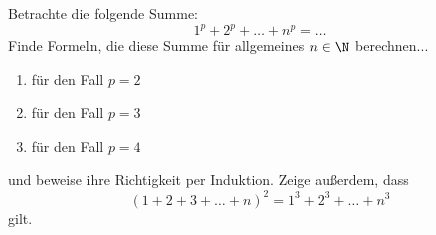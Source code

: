 \begin{prob}
  Betrachte die folgende Summe:
  \begin{equation*}
    1^p + 2^p + \ldots + n^p = \ldots
  \end{equation*}
  Finde Formeln, die diese Summe für allgemeines $n \in \N$ berechnen...
  \begin{enumerate}[label=(\alph*)]
  \item für den Fall $p=2$
  \item für den Fall $p=3$
  \item für den Fall $p=4$
  \end{enumerate}
  und beweise ihre Richtigkeit per Induktion. Zeige außerdem, dass
  \[
    (1 + 2 + 3 + \ldots + n)^2 = 1^3 + 2^3 + \ldots +n^3
  \]
  gilt.
\end{prob}
